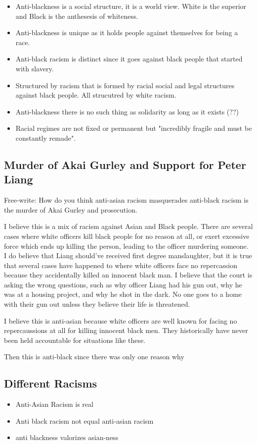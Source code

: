 \documentclass{article}
\begin{document}
\begin{itemize}
  \item Anti-blackness is a social structure,
    it is a world view. White is the superior and Black is the anthesesis of whiteness.
  \item Anti-blackness is unique as it holds people against themselves for being a race.
  \item Anti-black racism is distinct since it goes against black people that started with slavery.
  \item Structured by racism that is formed by racial social and legal structures against
    black people. All strucutred by white racism.
  \item Anti-blackness there is no such thing as solidarity as long as it exists (??)
  \item Racial regimes are not fixed or permanent but "incredibly fragile 
    and must be constantly remade".
\end{itemize}

\subsection{Murder of Akai Gurley and Support for Peter Liang}
Free-write: How do you think anti-asian racism masquerades anti-black
racism is the murder of Akai Gurley and prosecution.

I believe this is a mix of racism against Asian and Black people.
There are several cases where white officers kill black people for no reason
at all, or exert excessive force which ends up killing the person, leading
to the officer murdering someone.
I do believe that Liang should've received first degree manslaughter,
but it is true that several cases have happened to where white officers face
no repercassion because they accidentally killed an innocent black man.
I believe that the court is asking the wrong questions, such as why officer Liang
had his gun out, why he was at a housing project, and why he shot in the dark.
No one goes to a home with their gun out unless they believe their life is threatened.

I believe this is anti-asian because white officers are well known for facing
no repercaussions at all for killing innocent black men. They historically
have never been held accountable for situations like these.

Then this is anti-black since there was only one reason why

\subsection{Different Racisms}
\begin{itemize}
  \item Anti-Asian Racism is real
  \item Anti black racism not equal anti-asian racism
  \item anti blackness valorizes asian-ness
\end{itemize}
\end{document}
